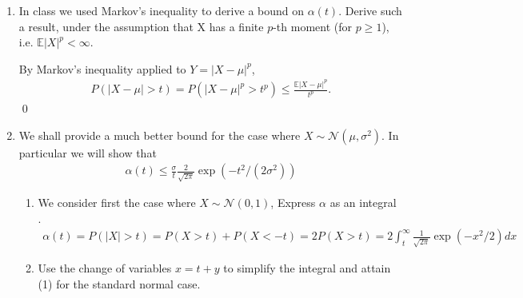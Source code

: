 \documentclass[10pt]{article}
\begin{document}
\begin{enumerate}[label=(\roman*)]
    \item In class we used Markov's inequality to derive a bound on $\alpha (t)$. Derive such a result, under the assumption that X has a finite $p$-th moment (for $p \ge 1 $), i.e. $\mathbb{E}|X|^p < \infty $.

    By Markov's inequality applied to $Y = |X - \mu|^p $, $\quad $ \cite[\textsc{Theorem 2.3}]{notes}
    \begin{gather*}
        P(|X - \mu| > t) = P(|X - \mu|^p > t^p) \le \frac{\mathbb{E}|X - \mu|^p}{t^p}.
    \end{gather*}    
    \qed

    \item We shall provide a much better bound for the case where $X \sim \mathcal{N}(\mu, \sigma^2) $. In particular we will show that 
    \begin{gather}
        \alpha(t) \le \frac{\sigma}{t} \frac{2}{\sqrt{2\pi}}\exp(-t^2 / (2\sigma^2))
    \end{gather}
    \begin{enumerate}[label=(\alph*)]
        \item We consider first the case where $X \sim \mathcal{N}(0, 1) $, Express $\alpha $ as an integral \cite[\textsc{Example 2.6}]{notes}. 
        \begin{gather*}
            \alpha(t) = P(|X| > t) = P(X > t) + P(X < -t) = 2P(X > t) = 2 \int_{t}^{\infty}\frac{1}{\sqrt{2\pi}}\exp(-x^2/2) dx
        \end{gather*}
        \item Use the change of variables $x = t + y $ to simplify the integral and attain (1) for the standard normal case.
        

\end{enumerate}
\end{enumerate}
\end{document}
